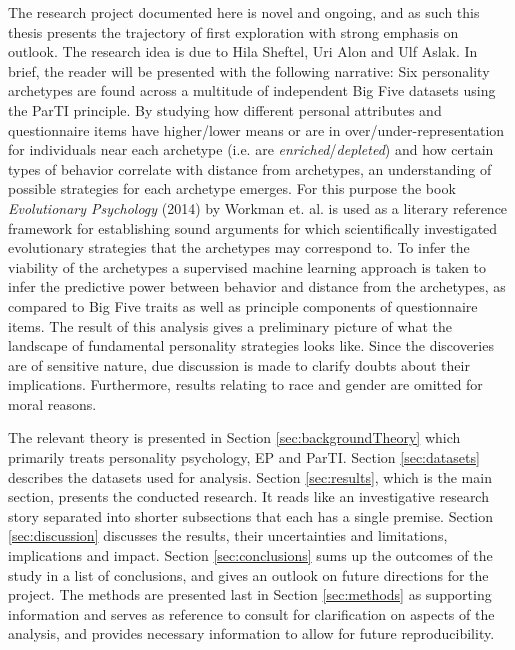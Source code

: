 The research project documented here is novel and ongoing, and as such this thesis presents the trajectory of first exploration with strong emphasis on outlook.
The research idea is due to Hila Sheftel, Uri Alon and Ulf Aslak.
In brief, the reader will be presented with the following narrative:
Six personality archetypes are found across a multitude of independent Big Five datasets using the ParTI principle.
By studying how different personal attributes and questionnaire items have higher/lower means or are in over/under-representation for individuals near each archetype (i.e. are \textit{enriched}/\textit{depleted}) and how certain types of behavior correlate with distance from archetypes, an understanding of possible strategies for each archetype emerges.
For this purpose the book \textit{Evolutionary Psychology} (2014) by Workman et. al. is used as a literary reference framework for establishing sound arguments for which scientifically investigated evolutionary strategies that the archetypes may correspond to.
To infer the viability of the archetypes a supervised machine learning approach is taken to infer the predictive power between behavior and distance from the archetypes, as compared to Big Five traits as well as principle components of questionnaire items.
The result of this analysis gives a preliminary picture of what the landscape of fundamental personality strategies looks like.
Since the discoveries are of sensitive nature, due discussion is made to clarify doubts about their implications.
Furthermore, results relating to race and gender are omitted for moral reasons.

The relevant theory is presented in Section \ref{sec:backgroundTheory} which primarily treats personality psychology, EP and ParTI.
Section \ref{sec:datasets} describes the datasets used for analysis.
Section \ref{sec:results}, which is the main section, presents the conducted research.
It reads like an investigative research story separated into shorter subsections that each has a single premise.
Section \ref{sec:discussion} discusses the results, their uncertainties and limitations, implications and impact.
Section \ref{sec:conclusions} sums up the outcomes of the study in a list of conclusions, and gives an outlook on future directions for the project.
The methods are presented last in Section \ref{sec:methods} as supporting information and serves as reference to consult for clarification on aspects of the analysis, and provides necessary information to allow for future reproducibility.